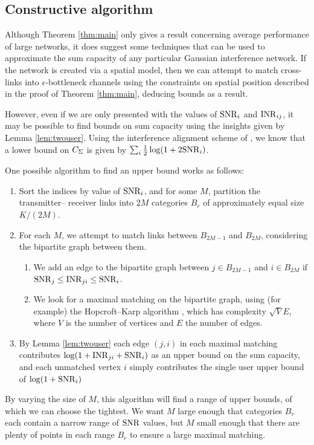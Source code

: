 \documentclass[journal]{IEEEtran}
\begin{document}
\subsection{Constructive algorithm} \label{sec:algorithm}
%
Although Theorem \ref{thm:main} only gives a result concerning average performance of large networks,
it does suggest some techniques that can be used to approximate the sum capacity of any
particular 
Gaussian interference network. If the network is created via a spatial model, then we can
attempt to match cross-links into $\epsilon$-bottleneck channels using the constraints on
spatial position described in the proof of Theorem \ref{thm:main}, deducing bounds as a
result.

However, even if we are only presented with the values of ${\rm{SNR}}_i$ and ${\rm{INR}}_{ij}$, it may
be possible to find bounds on sum capacity using the insights given by Lemma \ref{lem:twouser}.
Using the interference alignment scheme of \cite{nazer}, we know that a lower bound on 
$C_{\Sigma}$ is given by $\sum_i \frac{1}{2} \log(1 + 2{\rm{SNR}}_i)$.

One possible algorithm to find an upper bound works as follows:
\begin{enumerate}
\item Sort the indices by value of ${\rm{SNR}}_i$, and for some $M$, partition the transmitter--
receiver links into $2M$ categories $B_{r}$ of approximately equal size $K/(2M)$.
\item For each $M$, we attempt to match links between $B_{2M-1}$ and $B_{2M}$, considering the
bipartite graph between them. 
\begin{enumerate}
\item We add an edge to the bipartite graph between $j \in B_{2M-1}$
and $i \in B_{2M}$ if ${\rm{SNR}}_j \leq {\rm{INR}}_{ji} \leq {\rm{SNR}}_i$.
\item We look for a maximal matching on the bipartite graph, using (for example) the
Hopcroft--Karp algorithm \cite{hopcroft}, 
which has complexity $\sqrt{V} E$, where $V$ is the number of
vertices and $E$ the number of edges.
\end{enumerate}
\item By Lemma \ref{lem:twouser}
each edge $(j,i)$ in each maximal matching contributes $\log(1 + {\rm{INR}}_{ji} + {\rm{SNR}}_i)$ as an
upper bound on the sum capacity, and each unmatched vertex $i$ simply contributes the single
user upper bound of $\log(1+{\rm{SNR}}_i)$
\end{enumerate}

By varying the size of $M$, this algorithm will find a range of
upper bounds, of which we can choose the tightest. We want $M$ large enough that
categories $B_r$ each contain a narrow range of ${\rm{SNR}}$ values, but $M$ small enough
that there are plenty of points in each range $B_r$ to ensure a large maximal matching.
%
\end{document}

